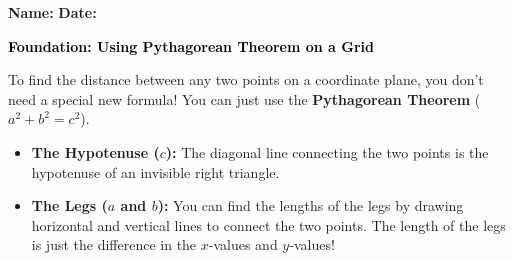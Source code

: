 \documentclass[12pt, letterpaper, fleqn]{article}
\begin{document}
\textbf{Name:} \underline{\hspace{5cm}}
\hfill
\textbf{Date:} \underline{\hspace{3cm}}\\

\begin{tcolorbox}[colback=customteal!20]
    \large\textcolor{black}{\textbf{Foundation: Using Pythagorean Theorem on a Grid}}
\end{tcolorbox}

\vspace{3mm}

\noindent
To find the distance between any two points on a coordinate plane, you don't need a special new formula! You can just use the \textbf{Pythagorean Theorem} ($a^2 + b^2 = c^2$).

\begin{itemize}
    \item \textbf{The Hypotenuse ($c$):} The diagonal line connecting the two points is the hypotenuse of an invisible right triangle.
    \item \textbf{The Legs ($a$ and $b$):} You can find the lengths of the legs by drawing horizontal and vertical lines to connect the two points. The length of the legs is just the difference in the $x$-values and $y$-values!
\end{itemize}

\vspace{4mm}
\end{document}
